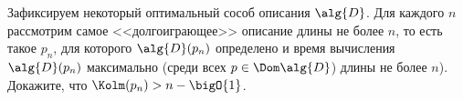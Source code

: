 Зафиксируем некоторый оптимальный сособ описания $\alg{D}$. Для каждого $n$ рассмотрим самое
<<долгоиграющее>> описание длины не более $n$, то есть такое $p_n$, для которого $\alg{D}(p_n)$
определено и время вычисления $\alg{D}(p_n)$ максимально (среди всех $p \in \Dom\alg{D}$) длины не более
$n$). Докажите, что $\Kolm(p_n) > n - \bigO{1}$.